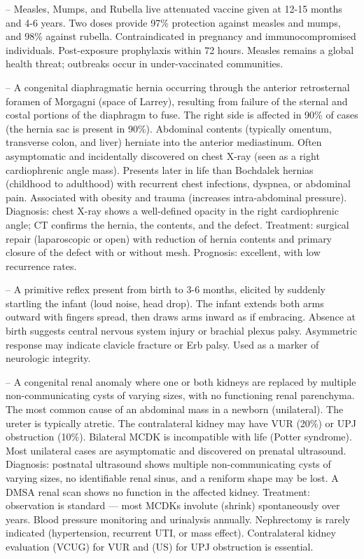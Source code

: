 -- Measles, Mumps, and Rubella live attenuated vaccine given at 12-15 months and 4-6 years. Two doses provide 97\% protection against measles and mumps, and 98\% against rubella. Contraindicated in pregnancy and immunocompromised individuals. Post-exposure prophylaxis within 72 hours. Measles remains a global health threat; outbreaks occur in under-vaccinated communities.

-- A congenital diaphragmatic hernia occurring through the anterior retrosternal foramen of Morgagni (space of Larrey), resulting from failure of the sternal and costal portions of the diaphragm to fuse. The right side is affected in 90\% of cases (the hernia sac is present in 90\%). Abdominal contents (typically omentum, transverse colon, and liver) herniate into the anterior mediastinum. Often asymptomatic and incidentally discovered on chest X-ray (seen as a right cardiophrenic angle mass). Presents later in life than Bochdalek hernias (childhood to adulthood) with recurrent chest infections, dyspnea, or abdominal pain. Associated with obesity and trauma (increases intra-abdominal pressure). Diagnosis: chest X-ray shows a well-defined opacity in the right cardiophrenic angle; CT confirms the hernia, the contents, and the defect. Treatment: surgical repair (laparoscopic or open) with reduction of hernia contents and primary closure of the defect with or without mesh. Prognosis: excellent, with low recurrence rates.

-- A primitive reflex present from birth to 3-6 months, elicited by suddenly startling the infant (loud noise, head drop). The infant extends both arms outward with fingers spread, then draws arms inward as if embracing. Absence at birth suggests central nervous system injury or brachial plexus palsy. Asymmetric response may indicate clavicle fracture or Erb palsy. Used as a marker of neurologic integrity.

-- A congenital renal anomaly where one or both kidneys are replaced by multiple non-communicating cysts of varying sizes, with no functioning renal parenchyma. The most common cause of an abdominal mass in a newborn (unilateral). The ureter is typically atretic. The contralateral kidney may have VUR (20\%) or UPJ obstruction (10\%). Bilateral MCDK is incompatible with life (Potter syndrome). Most unilateral cases are asymptomatic and discovered on prenatal ultrasound. Diagnosis: postnatal ultrasound shows multiple non-communicating cysts of varying sizes, no identifiable renal sinus, and a reniform shape may be lost. A DMSA renal scan shows no function in the affected kidney. Treatment: observation is standard — most MCDKs involute (shrink) spontaneously over years. Blood pressure monitoring and urinalysis annually. Nephrectomy is rarely indicated (hypertension, recurrent UTI, or mass effect). Contralateral kidney evaluation (VCUG) for VUR and (US) for UPJ obstruction is essential.

